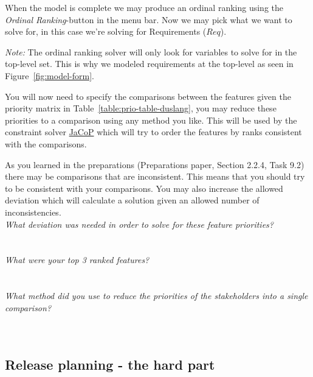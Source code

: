 \documentclass[11pt]{article}
\begin{document}
When the model is complete we may produce an ordinal ranking using the \textit{Ordinal Ranking}-button in the menu bar. Now we may pick what we want to solve for, in this case we're solving for Requirements ($Req$).

\begin{framed}
\textit{Note:} The ordinal ranking solver will only look for variables to solve for in the top-level set. This is why we modeled requirements at the top-level as seen in Figure~\ref{fig:model-form}.
\end{framed}

You will now need to specify the comparisons between the features given the priority matrix in Table~\ref{table:prio-table-duslang}, you may reduce these priorities to a comparison using any method you like. This will be used by the constraint solver \href{http://www.lth.se/jacop}{JaCoP} which will try to order the features by ranks consistent with the comparisons.

As you learned in the preparations (Preparations paper, Section 2.2.4, Task 9.2) there may be comparisons that are inconsistent. This means that you should try to be consistent with your comparisons. You may also increase the allowed deviation which will calculate a solution given an allowed number of inconsistencies.\\

\noindent\textit{What deviation was needed in order to solve for these feature priorities?}\\ \\
\underline{\hspace{0.9\textwidth}}\\

\noindent\textit{What were your top 3 ranked features?}\\ \\
\underline{\hspace{0.9\textwidth}}\\

\noindent\textit{What method did you use to reduce the priorities of the stakeholders into a single comparison?}\\ \\
\underline{\hspace{0.9\textwidth}}\\

%
%
\newpage
\subsection{Release planning - the hard part}
\end{document}
